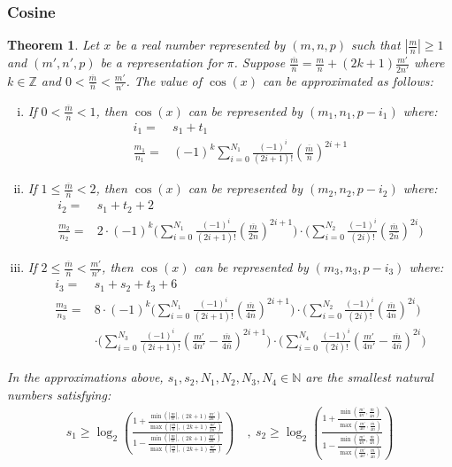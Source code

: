 \documentclass{article}
\newcommand{\nat}{\mathbb{N}}
\newcommand{\integer}{\mathbb{Z}}
\newcommand{\om}{\overline{m}}
\newcommand{\on}{\overline{n}}
\newtheorem{mytheorem}{Theorem}
\numberwithin{mytheorem}{section}
\newcommand{\taylorsin}[3] {\sum_{i=#1}^{#2}\frac{(-1)^i}{(2i+1)!}{#3}^{2i+1}}
\newcommand{\taylorcos}[3] {\sum_{i=#1}^{#2}\frac{(-1)^i}{(2i)!}{#3}^{2i}}
\begin{document}
\subsubsection{Cosine}\label{subsubsec:extend_cos}
\begin{mytheorem}\label{thm:extend_cos}
Let $x$ be a real number represented by $(m,n,p)$ such that $|\frac{m}{n}|\geq 1$ and $(m',n',p)$ be a representation for $\pi$. Suppose $\frac{\om}{\on}=\frac{m}{n}+(2k+1)\frac{m'}{2n'}$ where $k\in\integer$ and $0<\frac{\om}{\on}<\frac{m'}{n'}$. The value of $\cos(x)$ can be approximated as follows:
\begin{enumerate}[i.]
\item \label{thm:extend_cos_1}
If $0<\frac{\om}{\on}<1$, then $\cos(x)$ can be represented by $(m_1,n_1,p-i_1)$ where:
\begin{align*}
i_1=&s_1+t_1\\
\frac{m_1}{n_1}=&(-1)^k\taylorsin{0}{N_1}{(\frac{\om}{\on})}
\end{align*}
\item \label{thm:extend_cos_2}
If $1\leq \frac{\om}{\on}<2$, then $\cos(x)$ can be represented by $(m_2,n_2,p-i_2)$ where:
\begin{align*}
i_2=&s_1+t_2+2\\
\frac{m_2}{n_2}=&2\cdot(-1)^k\bigg( \taylorsin{0}{N_1}{(\frac{\om}{2\on})}\bigg)\cdot\bigg(\taylorcos{0}{N_2}{(\frac{\om}{2\on})}\bigg)
\end{align*}
\item \label{thm:extend_cos_3}
If $2\leq \frac{\om}{\on}<\frac{m'}{n'}$, then $\cos(x)$ can be represented by $(m_3,n_3,p-i_3)$ where:
\begin{align*}
i_3=&s_1+s_2+t_3+6\\
\frac{m_3}{n_3}=&8\cdot (-1)^k \bigg(\taylorsin{0}{N_1}{(\frac{\om}{4\on})}\bigg)\cdot\bigg(\taylorcos{0}{N_2}{(\frac{\om}{4\on})}\bigg)\\
& \cdot\bigg(\taylorsin{0}{N_3}{(\frac{m'}{4n'}-\frac{\om}{4\on})}\bigg)\cdot\bigg(\taylorcos{0}{N_4}{(\frac{m'}{4n'}-\frac{\om}{4\on})}\bigg)
\end{align*}
\end{enumerate}
In the approximations above, $s_1,s_2,N_1,N_2,N_3,N_4\in\nat$ are the smallest natural numbers satisfying:
\begin{align*}
s_1\geq \log_2(\frac{1+\frac{\min(|\frac{m}{n}|,(2k+1)\frac{m'}{2n'})}{\max(|\frac{m}{n}|,(2k+1)\frac{m'}{2n'})}}{1-\frac{\min(|\frac{m}{n}|,(2k+1)\frac{m'}{2n'})}{\max(|\frac{m}{n}|,(2k+1)\frac{m'}{2n'})}})~&,~s_2\geq \log_2(\frac{1+\frac{\min(\frac{m'}{4n'},\frac{\om}{4\on})}{\max(\frac{m'}{4n'},\frac{\om}{4\on})}}{1-\frac{\min(\frac{m'}{4n'},\frac{\om}{4\on})}{\max(\frac{m'}{4n'},\frac{\om}{4\on})}})\\

\end{align*}
\end{mytheorem}
\end{document}
